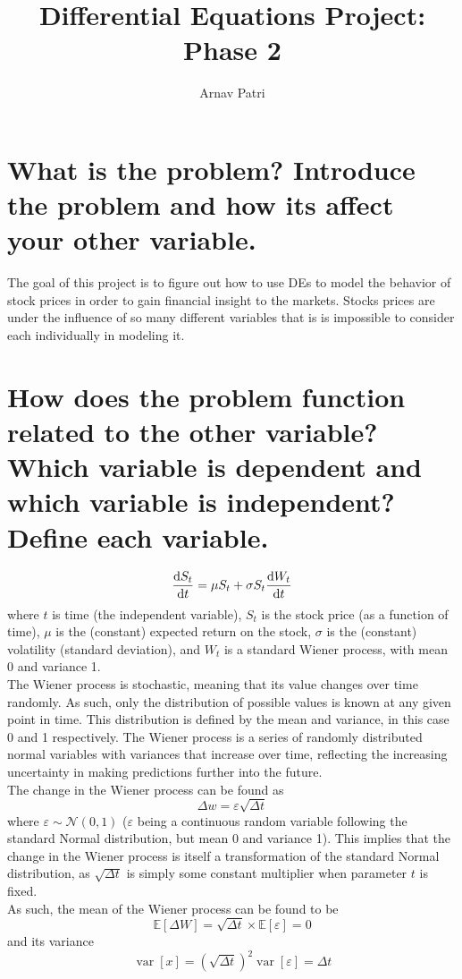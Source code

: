 \documentclass[12pt, A4]{article}
\title{Differential Equations Project: Phase 2}
\author{Arnav Patri}
\newcommand{\Exp}{\mathbb{E}}
\newcommand{\ndist}{\mathcal{N}}
\DeclareMathOperator{\vari}{var}
\begin{document}
	\maketitle
		\section{What is the problem? Introduce the problem and how its affect your other variable.}
			The goal of this project is to figure out how to use DEs to model the behavior of stock prices in order to gain financial insight to the markets. Stocks prices are under the influence of so many different variables that is is impossible to consider each individually in modeling it. 
		\section{How does the problem function related to the other variable? Which variable is dependent and which variable is independent? Define each variable.}
			\[\dv{S_t}{t} = \mu S_t + \sigma S_t\dv{W_t}{t}\]
				where \(t\) is time (the independent variable), \(S_t\) is the stock price (as a function of time), \(\mu\) is the (constant) expected return on the stock, \(\sigma\) is the (constant) volatility (standard deviation), and \(W_t\) is a standard Wiener process, with mean 0 and variance 1. \\
			The Wiener process is stochastic, meaning that its value changes over time randomly. As such, only the distribution of possible values is known at any given point in time. This distribution is defined by the mean and variance, in this case 0 and 1 respectively. The Wiener process is a series of randomly distributed normal variables with variances that increase over time, reflecting the increasing uncertainty in making predictions further into the future. \\
			The change in the Wiener process can be found as
				\[\Delta w = \varepsilon\sqrt{\Delta t}\]
				where \(\varepsilon \sim \ndist(0, 1)\) (\(\varepsilon\) being a continuous random variable following the standard Normal distribution, but mean 0 and variance 1). This implies that the change in the Wiener process is itself a transformation of the standard Normal distribution, as \(\sqrt{\Delta t}\) is simply some constant multiplier when parameter \(t\) is fixed. \\
				As such, the mean of the Wiener process can be found to be
					\[\Exp[\Delta W] = \sqrt{\Delta t} \times \Exp[\varepsilon] = 0\]
				and its variance
					\[\vari[x] = \left(\sqrt{\Delta t}\right)^2\vari[\varepsilon] = \Delta t\]
\end{document}
